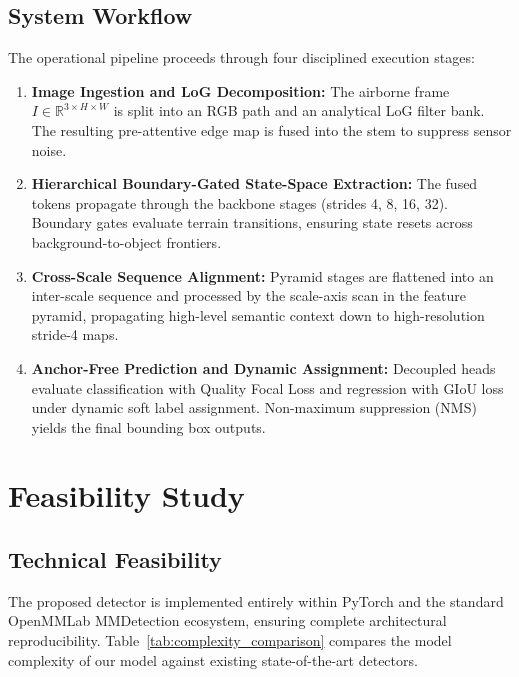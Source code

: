 \documentclass[12pt,a4paper]{report}
\begin{document}
\section{System Workflow}
The operational pipeline proceeds through four disciplined execution stages:
\begin{enumerate}[leftmargin=2em]
    \item \textbf{Image Ingestion and LoG Decomposition:} The airborne frame $I \in \mathbb{R}^{3 \times H \times W}$ is split into an RGB path and an analytical LoG filter bank. The resulting pre-attentive edge map is fused into the stem to suppress sensor noise.
    \item \textbf{Hierarchical Boundary-Gated State-Space Extraction:} The fused tokens propagate through the backbone stages (strides 4, 8, 16, 32). Boundary gates evaluate terrain transitions, ensuring state resets across background-to-object frontiers.
    \item \textbf{Cross-Scale Sequence Alignment:} Pyramid stages are flattened into an inter-scale sequence and processed by the scale-axis scan in the feature pyramid, propagating high-level semantic context down to high-resolution stride-4 maps.
    \item \textbf{Anchor-Free Prediction and Dynamic Assignment:} Decoupled heads evaluate classification with Quality Focal Loss and regression with GIoU loss under dynamic soft label assignment. Non-maximum suppression (NMS) yields the final bounding box outputs.
\end{enumerate}

\chapter{Feasibility Study}

\section{Technical Feasibility}
The proposed detector is implemented entirely within PyTorch and the standard OpenMMLab MMDetection ecosystem, ensuring complete architectural reproducibility. Table~\ref{tab:complexity_comparison} compares the model complexity of our model against existing state-of-the-art detectors.
\end{document}
